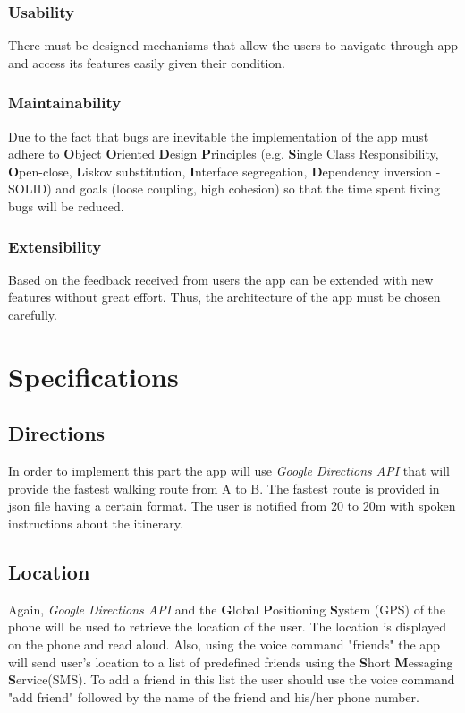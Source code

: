 \documentclass{article}[11]
\begin{document}
\subsubsection{Usability}
	There must be designed mechanisms that allow the users to navigate through app and access its features easily given their condition.

\subsubsection{Maintainability}
	Due to the fact that bugs are inevitable the implementation of the app must adhere to \textbf{O}bject \textbf{O}riented \textbf{D}esign \textbf{P}rinciples (e.g. \textbf{S}ingle Class Responsibility, \textbf{O}pen-close, \textbf{L}iskov substitution, \textbf{I}nterface segregation, \textbf{D}ependency inversion - SOLID) and goals (loose coupling, high cohesion) so that the time spent fixing bugs will be reduced. 


\subsubsection{Extensibility}
	Based on the feedback received from users the app can be extended with new features without great effort. Thus, the architecture of the app must be chosen carefully.


\section{Specifications}

\subsection{Directions}
	In order to implement this part the app will use \emph{Google Directions API} that will provide the fastest walking route from A to B. The fastest route is provided in json file having a certain format. The user is notified from 20 to 20m with spoken instructions about the itinerary.

\subsection{Location}
	Again, \emph{Google Directions API} and the \textbf{G}lobal \textbf{P}ositioning \textbf{S}ystem (GPS) of the phone will be used to retrieve the location of the user. The location is displayed on the phone and read aloud. Also, using the voice command "friends" the app will send user's location to a list of predefined friends using the \textbf{S}hort \textbf{M}essaging \textbf{S}ervice(SMS). To add a friend in this list the user should use the voice command "add friend" followed by the name of the friend and his/her phone number.
	
\end{document}
